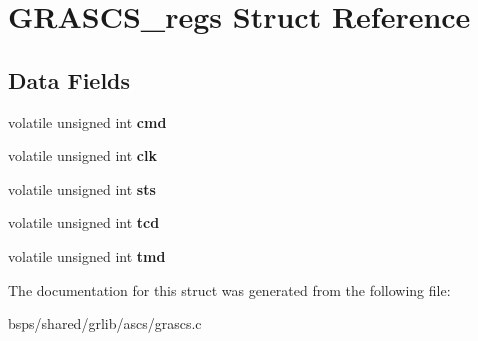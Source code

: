 \hypertarget{structGRASCS__regs}{}\section{G\+R\+A\+S\+C\+S\+\_\+regs Struct Reference}
\label{structGRASCS__regs}
\subsection*{Data Fields}
\begin{DoxyCompactItemize}
\item 
\mbox{\label{structGRASCS__regs_a9e332f73f396bd6002477d6d4491b2ab}} 
volatile unsigned int {\bfseries cmd}
\item 
\mbox{\label{structGRASCS__regs_aa06ed3d6cc80b81f48446f182d8432cf}} 
volatile unsigned int {\bfseries clk}
\item 
\mbox{\label{structGRASCS__regs_ae7eaaa4f7720329ce998cbba85ddecd8}} 
volatile unsigned int {\bfseries sts}
\item 
\mbox{\label{structGRASCS__regs_af68e429815ac3e65b7dda0f7f199acca}} 
volatile unsigned int {\bfseries tcd}
\item 
\mbox{\label{structGRASCS__regs_a9f658c49a2b7040b7b3e870803a344a8}} 
volatile unsigned int {\bfseries tmd}
\end{DoxyCompactItemize}


The documentation for this struct was generated from the following file\+:\begin{DoxyCompactItemize}
\item 
bsps/shared/grlib/ascs/grascs.\+c\end{DoxyCompactItemize}
